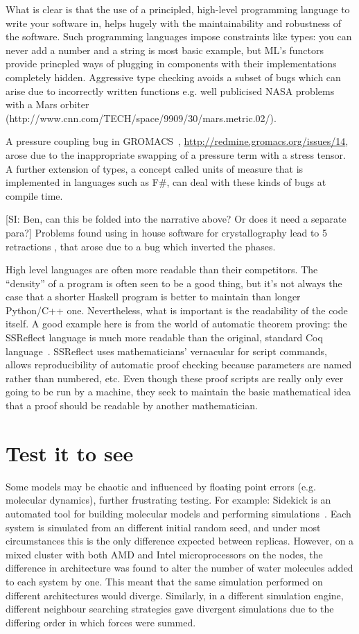 \documentclass[conference]{IEEEtran}
\begin{document}
What is clear is that the use of a principled, high-level programming
language to write your software in, helps hugely with the
maintainability and robustness of the software. Such programming
languages impose constraints like types: you can never add a number
and a string is most basic example, but ML's functors provide
princpled ways of plugging in components with their implementations
completely hidden. Aggressive type checking avoids a subset of bugs
which can arise due to incorrectly written functions e.g. well
publicised NASA problems with a Mars orbiter
(http://www.cnn.com/TECH/space/9909/30/mars.metric.02/).

A pressure coupling bug in GROMACS~\cite{Hess2008},
\url{http://redmine.gromacs.org/issues/14}, arose due to the
inappropriate swapping of a pressure term with a stress tensor.  A
further extension of types, a concept called units of measure that is
implemented in languages such as F\#, can deal with these kinds of
bugs at compile time.

[SI: Ben, can this be folded into the narrative above? Or does it need a separate para?]
Problems found using in house software for crystallography lead to 5
retractions \cite{Miller2006}, that arose due to a bug which inverted
the phases.

High level languages are often more readable than their
competitors. The ``density'' of a program is often seen to be a good
thing, but it's not always the case that a shorter Haskell program is
better to maintain than longer Python/C++ one. Nevertheless, what is
important is the readability of the code itself. A good example here
is from the world of automatic theorem proving: the SSReflect language
is much more readable than the original, standard Coq
language~\cite{GonthierZND13}. SSReflect uses mathematicians'
vernacular for script commands, allows reproducibility of automatic
proof checking because parameters are named rather than numbered,
etc. Even though these proof scripts are really only ever going to be
run by a machine, they seek to maintain the basic mathematical idea
that a proof should be readable by another mathematician.

\section{Test it to see}

Some models may be chaotic and influenced by floating point errors
(e.g. molecular dynamics), further frustrating testing. For example:
Sidekick is an automated tool for building molecular models and
performing simulations~\cite{Hall2014Sidekick}. Each system is
simulated from an different initial random seed, and under most
circumstances this is the only difference expected between
replicas. However, on a mixed cluster with both AMD and Intel
microprocessors on the nodes, the difference in architecture was found
to alter the number of water molecules added to each system by
one. This meant that the same simulation performed on different
architectures would diverge. Similarly, in a different simulation
engine, different neighbour searching strategies gave divergent
simulations due to the differing order in which forces were summed.
\end{document}
